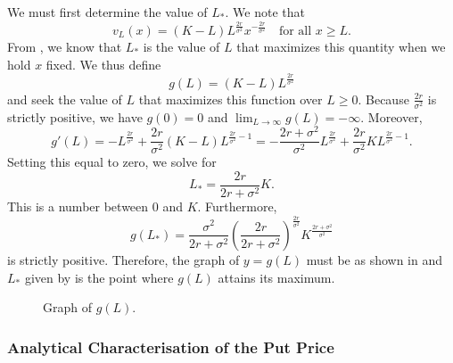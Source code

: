 We must first determine the value of $L_*$. We note that
\begin{equation}
	\label{eq:VLAboveL}
	v_L(x) = (K - L)L^{\frac{2r}{\sigma^2}} x^{-\frac{2r}{\sigma^2}} \quad \text{for all } x \ge L.
\end{equation}
From , we know that $L_*$ is the value of $L$ that maximizes this quantity when we hold $x$ fixed. We thus define
\begin{equation}
	\label{eq:GLDefinition}
	g(L) = (K - L)L^{\frac{2r}{\sigma^2}}
\end{equation}
and seek the value of $L$ that maximizes this function over $L \ge 0$. Because $\frac{2r}{\sigma^2}$ is strictly positive, we have $g(0) = 0$ and $\lim_{L \to \infty} g(L) = -\infty$. Moreover,
\begin{equation}
	\label{eq:GPrimeL}
	g'(L) = -L^{\frac{2r}{\sigma^2}} + \frac{2r}{\sigma^2}(K - L)L^{\frac{2r}{\sigma^2}-1} = -\frac{2r + \sigma^2}{\sigma^2}L^{\frac{2r}{\sigma^2}} + \frac{2r}{\sigma^2} K L^{\frac{2r}{\sigma^2}-1}.
\end{equation}
Setting this equal to zero, we solve for
\begin{equation}
	\label{eq:LStar}
	L_* = \frac{2r}{2r + \sigma^2} K.
\end{equation}
This is a number between 0 and $K$. Furthermore,
\begin{equation}
	\label{eq:GLStar}
	g(L_*) = \frac{\sigma^2}{2r + \sigma^2} \left( \frac{2r}{2r + \sigma^2} \right)^{\frac{2r}{\sigma^2}} K^{\frac{2r + \sigma^2}{\sigma^2}}
\end{equation}
is strictly positive. Therefore, the graph of $y = g(L)$ must be as shown in  and $L_*$ given by  is the point where $g(L)$ attains its maximum.

\begin{figure}[H]
	\centering
	
	\caption{Graph of \(g(L)\).}
	\label{fig:GraphOfGL}
\end{figure}

\subsubsection{Analytical Characterisation of the Put Price}


